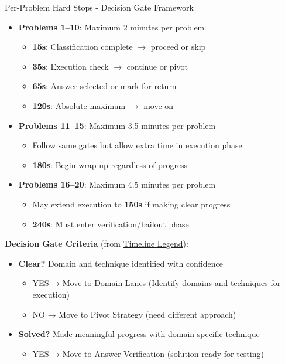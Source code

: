 \documentclass{article}
\newcommand{\timer}[1]{\textbf{\textcolor{timegreen}{#1}}}
\begin{document}
\begin{timebox}{Per-Problem Hard Stops - Decision Gate Framework}
\begin{itemize}[nosep]
\item \textbf{Problems 1--10}: Maximum 2 minutes per problem
  \begin{itemize}[nosep]
  \item \timer{15s}: Classification complete $\rightarrow$ proceed or skip
  \item \timer{35s}: Execution check $\rightarrow$ continue or pivot
  \item \timer{65s}: Answer selected or mark for return
  \item \timer{120s}: Absolute maximum $\rightarrow$ move on
  \end{itemize}
\item \textbf{Problems 11--15}: Maximum 3.5 minutes per problem
  \begin{itemize}[nosep]
  \item Follow same gates but allow extra time in execution phase
  \item \timer{180s}: Begin wrap-up regardless of progress
  \end{itemize}
\item \textbf{Problems 16--20}: Maximum 4.5 minutes per problem
  \begin{itemize}[nosep]
  \item May extend execution to \timer{150s} if making clear progress
  \item \timer{240s}: Must enter verification/bailout phase
  \end{itemize}
\end{itemize}
\textbf{Decision Gate Criteria} (from \hyperlink{timeline-legend}{Timeline Legend}):
\begin{itemize}[nosep]
\item \textbf{Clear?} Domain and technique identified with confidence
 \begin{itemize}[nosep]
     \item YES → Move to Domain Lanes (Identify domains and techniques for execution)
     \item NO → Move to Pivot Strategy (need different approach)
 \end{itemize}
\item \textbf{Solved?} Made meaningful progress with domain-specific technique
   \begin{itemize}[nosep]
   \item YES → Move to Answer Verification (solution ready for testing)

\end{itemize}
\end{itemize}
\end{timebox}
\end{document}
